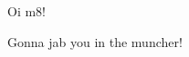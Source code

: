 \documentclass{article}
\begin{document}
Oi m\(8\)!\par
Gonna jab you in the muncher!
\end{document}

